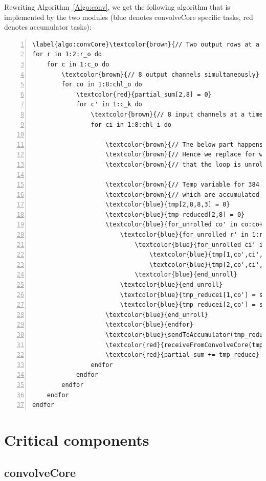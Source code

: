 \documentclass[a4paper,12pt, final]{report}
\begin{document}
Rewriting Algorithm~\ref{Algo:conv}, we get the following algorithm that is implemented by the two modules (blue denotes convolveCore specific tasks, red denotes accumulator tasks):

\begin{Verbatim}[numbers=left,commandchars=\\\{\}]
\label{algo:convCore}\textcolor{brown}{// Two output rows at a time}
for r in 1:2:r_o do
	for c in 1:c_o do
		\textcolor{brown}{// 8 output channels simultaneously}
		for co in 1:8:chl_o do
			\textcolor{red}{partial_sum[2,8] = 0}
			for c' in 1:c_k do
				\textcolor{brown}{// 8 input channels at a time}
				for ci in 1:8:chl_i do

					\textcolor{brown}{// The below part happens in one loop of the core}
					\textcolor{brown}{// Hence we replace for with for_unrolled which signifies}
					\textcolor{brown}{// that the loop is unrolled over the range of its iterators}

					\textcolor{brown}{// Temp variable for 384 multiplications}
					\textcolor{brown}{// which are accumulated and reduced to 16 partial sums}
					\textcolor{blue}{tmp[2,8,8,3] = 0}
					\textcolor{blue}{tmp_reduced[2,8] = 0}
					\textcolor{blue}{for_unrolled co' in co:co+7 do}
						\textcolor{blue}{for_unrolled r' in 1:r_k do}
							\textcolor{blue}{for_unrolled ci' in ci:ci+7 do}
								\textcolor{blue}{tmp[1,co',ci',r'] = input[r+r'-1,c+c'-1,ci']*kernel[co',r',c',ci']}
								\textcolor{blue}{tmp[2,co',ci',r'] = input[r+r',c+c'-1,ci']*kernel[co',r',c',ci']}
							\textcolor{blue}{end_unroll}
						\textcolor{blue}{end_unroll}
						\textcolor{blue}{tmp_reducei[1,co'] = sum(tmp[1,co',:,:])}
						\textcolor{blue}{tmp_reducei[2,co'] = sum(tmp[2,co',:,:])}
					\textcolor{blue}{end_unroll}
					\textcolor{blue}{endfor}
					\textcolor{blue}{sendToAccumulator(tmp_reduce)}
					\textcolor{red}{receiveFromConvolveCore(tmp_reduce)}
					\textcolor{red}{partial_sum += tmp_reduce} \textcolor{brown}{// Element wise sum}
				endfor
			endfor
		endfor
	endfor
endfor
\end{Verbatim}

\section{Critical components}

\subsection{convolveCore}\label{sec:convCore}
\end{document}
